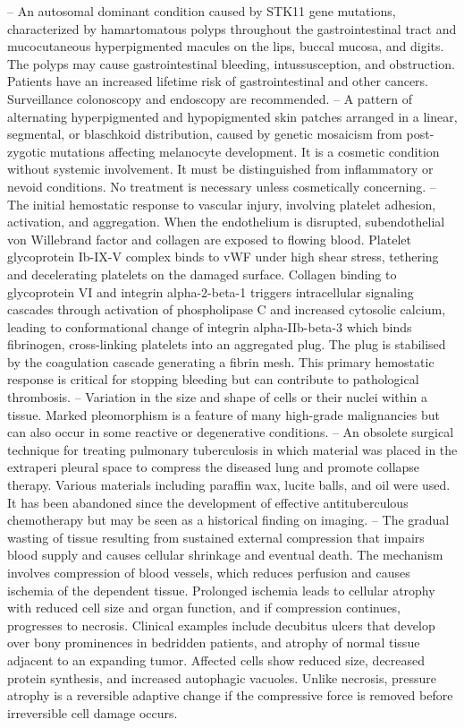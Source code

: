 -- An autosomal dominant condition caused by STK11 gene mutations, characterized by hamartomatous polyps throughout the gastrointestinal tract and mucocutaneous hyperpigmented macules on the lips, buccal mucosa, and digits. The polyps may cause gastrointestinal bleeding, intussusception, and obstruction. Patients have an increased lifetime risk of gastrointestinal and other cancers. Surveillance colonoscopy and endoscopy are recommended.
-- A pattern of alternating hyperpigmented and hypopigmented skin patches arranged in a linear, segmental, or blaschkoid distribution, caused by genetic mosaicism from post-zygotic mutations affecting melanocyte development. It is a cosmetic condition without systemic involvement. It must be distinguished from inflammatory or nevoid conditions. No treatment is necessary unless cosmetically concerning.
-- The initial hemostatic response to vascular injury, involving platelet adhesion, activation, and aggregation. When the endothelium is disrupted, subendothelial von Willebrand factor and collagen are exposed to flowing blood. Platelet glycoprotein Ib-IX-V complex binds to vWF under high shear stress, tethering and decelerating platelets on the damaged surface. Collagen binding to glycoprotein VI and integrin alpha-2-beta-1 triggers intracellular signaling cascades through activation of phospholipase C and increased cytosolic calcium, leading to conformational change of integrin alpha-IIb-beta-3 which binds fibrinogen, cross-linking platelets into an aggregated plug. The plug is stabilised by the coagulation cascade generating a fibrin mesh. This primary hemostatic response is critical for stopping bleeding but can contribute to pathological thrombosis.
-- Variation in the size and shape of cells or their nuclei within a tissue. Marked pleomorphism is a feature of many high-grade malignancies but can also occur in some reactive or degenerative conditions.
-- An obsolete surgical technique for treating pulmonary tuberculosis in which material was placed in the extraperi pleural space to compress the diseased lung and promote collapse therapy. Various materials including paraffin wax, lucite balls, and oil were used. It has been abandoned since the development of effective antituberculous chemotherapy but may be seen as a historical finding on imaging.
-- The gradual wasting of tissue resulting from sustained external compression that impairs blood supply and causes cellular shrinkage and eventual death. The mechanism involves compression of blood vessels, which reduces perfusion and causes ischemia of the dependent tissue. Prolonged ischemia leads to cellular atrophy with reduced cell size and organ function, and if compression continues, progresses to necrosis. Clinical examples include decubitus ulcers that develop over bony prominences in bedridden patients, and atrophy of normal tissue adjacent to an expanding tumor. Affected cells show reduced size, decreased protein synthesis, and increased autophagic vacuoles. Unlike necrosis, pressure atrophy is a reversible adaptive change if the compressive force is removed before irreversible cell damage occurs.
